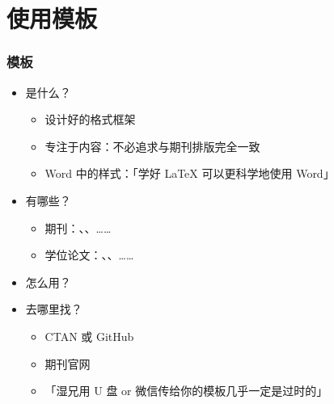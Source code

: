 \section{使用模板}

\begin{frame}[fragile]
\frametitle{模板}
\begin{itemize}
  \item<+-> 是什么？

    \begin{itemize}
      \item 设计好的格式框架
      \item 专注于内容：\alert{不必追求与期刊排版完全一致}
      \item Word 中的样式：「学好 \LaTeX{} 可以更科学地使用 Word」
    \end{itemize}

  \item<+-> 有哪些？

    \begin{itemize}
      \item 期刊：、、……
      \item 学位论文：、、……
    \end{itemize}

  \item<+-> 怎么用？


  \item<+-> 去哪里找？

    \begin{itemize}
      \item CTAN  或 GitHub \href{https://github.com}{\faGithub}
      \item 期刊官网
      \item 「湿兄用 U 盘 or 微信传给你的模板几乎一定是过时的」
    \end{itemize}
\end{itemize}
\end{frame}

